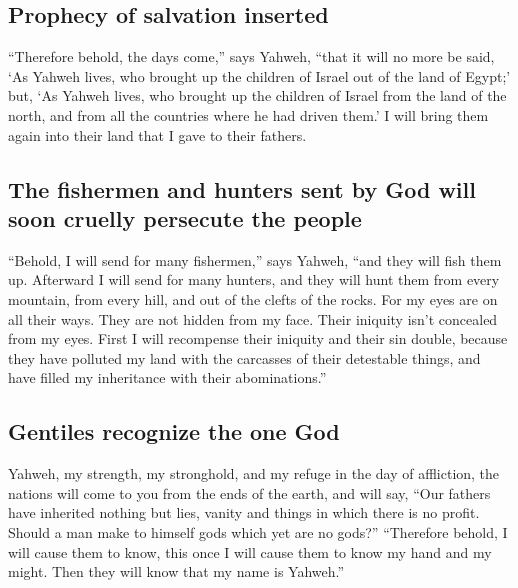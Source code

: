 \begin{paracol}{2}
\begin{otherlanguage}{english}
\hypertarget{prophecy-of-salvation-inserted}{%
\subsection{Prophecy of salvation
inserted}\label{prophecy-of-salvation-inserted}}

 ``Therefore behold, the days come,'' says Yahweh, ``that
it will no more be said, `As Yahweh lives, who brought up the children
of Israel out of the land of Egypt;'  but, `As Yahweh
lives, who brought up the children of Israel from the land of the north,
and from all the countries where he had driven them.' I will bring them
again into their land that I gave to their fathers.

\hypertarget{the-fishermen-and-hunters-sent-by-god-will-soon-cruelly-persecute-the-people}{%
\subsection{The fishermen and hunters sent by God will soon cruelly
persecute the
people}\label{the-fishermen-and-hunters-sent-by-god-will-soon-cruelly-persecute-the-people}}

 ``Behold, I will send for many fishermen,'' says Yahweh,
``and they will fish them up. Afterward I will send for many hunters,
and they will hunt them from every mountain, from every hill, and out of
the clefts of the rocks.  For my eyes are on all their
ways. They are not hidden from my face. Their iniquity isn't concealed
from my eyes.  First I will recompense their iniquity and
their sin double, because they have polluted my land with the carcasses
of their detestable things, and have filled my inheritance with their
abominations.''

\hypertarget{gentiles-recognize-the-one-god}{%
\subsection{Gentiles recognize the one
God}\label{gentiles-recognize-the-one-god}}

 Yahweh, my strength, my stronghold, and my refuge in the
day of affliction, the nations will come to you from the ends of the
earth, and will say, ``Our fathers have inherited nothing but lies,
vanity and things in which there is no profit.  Should a
man make to himself gods which yet are no gods?'' 
``Therefore behold, I will cause them to know, this once I will cause
them to know my hand and my might. Then they will know that my name is
Yahweh.''


\end{otherlanguage}
\end{paracol}
